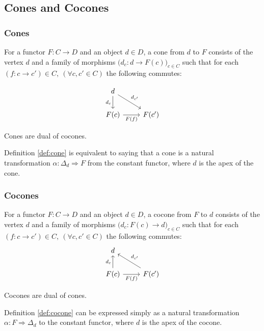 \subsection{Cones and Cocones}

\subsubsection*{Cones}

\begin{definition} For a functor $F:C\to D$
	and an object $d\in D$, a cone from $d$ to $F$ consists of the vertex $d$ and
	a family of morphisms $\big(d_c: d \to F(c)\big)_{c\in C}$ such that for each
	$(f:c\to c')\in C,\ (\forall c,c'\in C)$ the following commutes:
	\parencite{awodey:category_theory}

	\[\begin{tikzcd}
		d \\
		{F(c)} & {F(c')}
		\arrow["{d_{c'}}", from=1-1, to=2-2]
		\arrow["{d_c}"', from=1-1, to=2-1]
		\arrow["{F(f)}"', from=2-1, to=2-2]
	\end{tikzcd}\]
\end{definition}

\begin{remark}
	Cones are dual of cocones.
\end{remark}

\begin{definition}
	Definition \ref{def:cone} is equivalent to saying that a cone is a natural
	transformation $\alpha: \Delta_d \Rightarrow F$ from the constant functor,
	where $d$ is the apex of the cone.
\end{definition}

\subsubsection*{Cocones}
\begin{definition}
	For a functor $F:C\to D$ and an object $d\in D$, a cocone from $F$ to $d$
	consists of the vertex $d$ and a family of morphisms $\big(d_c: F(c) \to
	d\big)_{c\in C}$ such that for each $(f:c\to c')\in C,\ (\forall c,c'\in C)$
	the following commutes:
	\parencite{leinster:basic_category_theory}
	\[\begin{tikzcd}[ampersand replacement=\&]
		d \\
		{F(c)} \& {F(c')}
		\arrow["{d_{c'}}"', from=2-2, to=1-1]
		\arrow["{d_c}", from=2-1, to=1-1]
		\arrow["{F(f)}"', from=2-1, to=2-2]
	\end{tikzcd}\]
\end{definition}

\begin{remark}
	Cocones are dual of cones.
\end{remark}

\begin{remark}
	Definition \ref{def:cocone} can be expressed simply as a natural
	transformation $\alpha: F \Rightarrow \Delta_d$ to the constant functor,
	where $d$ is the apex of the cocone.
\end{remark}